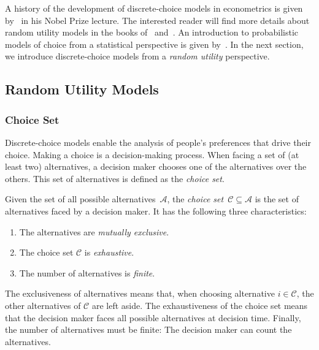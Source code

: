A history of the development of discrete-choice models in econometrics is given by~\citet{mcfadden2001economic} in his Nobel Prize lecture.
The interested reader will find more details about random utility models in the books of~\citet[Chapter~1]{train2009discrete} and~\citet[Chapter~3]{hensher2005applied}.
An introduction to probabilistic models of choice from a statistical perspective is given by~\citet[Chapter~1]{maystre2018efficient}.
In the next section, we introduce discrete-choice models from a \emph{random utility} perspective.

\subsection{Random Utility Models}

\subsubsection{Choice Set}
Discrete-choice models enable the analysis of people's preferences that drive their choice.
Making a choice is a decision-making process.
When facing a set of (at least two) alternatives, a decision maker chooses one of the alternatives over the others.
This set of alternatives is defined as the \emph{choice set}.

\begin{definition}
	Given the set of all possible alternatives~$\mathcal{A}$, the \emph{choice set}~$\mathcal{C} \subseteq \mathcal{A}$ is the set of alternatives faced by a decision maker.
	It has the following three characteristics:
	\begin{enumerate}
		\item The alternatives are \emph{mutually exclusive}.
		\item The choice set $\mathcal{C}$ is \emph{exhaustive}.
		\item The number of alternatives is \emph{finite}.
	\end{enumerate}
\end{definition}

The exclusiveness of alternatives means that, when choosing alternative $i \in \mathcal{C}$, the other alternatives of $\mathcal{C}$ are left aside.
The exhaustiveness of the choice set means that the decision maker faces all possible alternatives at decision time.
Finally, the number of alternatives must be finite:
The decision maker can count the alternatives.

